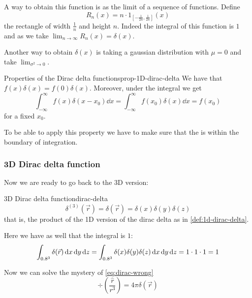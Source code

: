\documentclass[12pt]{extarticle}
\begin{document}
A way to obtain this function is as the limit of a sequence of functions. Define
\begin{equation}
	R_n(x) = n \cdot 1_{[-\frac{1}{2n}, \frac{1}{2n}]}(x)
\end{equation}
the rectangle of width $\frac{1}{n}$ and height $n$.
Indeed the integral of this function is $1$ and as we take $\lim_{n \to \infty} R_n(x) = \delta(x)$.

Another way to obtain $\delta(x)$ is taking a gaussian distribution with $\mu = 0$ and take $\lim_{\sigma^2 \to 0}$.

\begin{proposition}{Properties of the Dirac delta functions}{prop-1D-dirac-delta}
	We have that $f(x)\delta(x) = f(0) \delta(x)$.
	Moreover, under the integral we get
	\begin{equation}
		\int_{-\infty}^{\infty} f(x) \delta(x - x_0) \dd{x} = \int_{-\infty}^{\infty} f(x_0) \delta(x) \dd{x} = f(x_0)
	\end{equation}
	for a fixed $x_0$.
\end{proposition}

To be able to apply this property we have to make sure that the  is within the boundary of integration.

\subsubsection{3D Dirac delta function}

Now we are ready to go back to the 3D version:
\begin{definition}{3D Dirac delta function}{dirac-delta}
	\begin{equation}
		\delta^{(3)}(\vec r) = \delta(\vec r) = \delta(x) \delta(y) \delta(z)
	\end{equation}
	that is, the product of the 1D version of the dirac delta as in \cref{def:1d-dirac-delta}.
\end{definition}

Here we have as well that the integral is $1$:
\begin{equation}
	\int_{0.8^3} \delta(\vec r) \dd{x} \dd{y} \dd{z} = \int_{0.8^3} \delta(x) \delta(y) \delta(z) \dd{x} \dd{y} \dd{z} = 1 \cdot 1 \cdot 1 = 1
\end{equation}

Now we can solve the mystery of \cref{eq:dirac-wrong}
\begin{equation}
	\label{eq:dirac-delta-ok}
	\div \left( \frac{\hat r}{r^3} \right) = 4 \pi \delta(\vec r)
\end{equation}
\end{document}

